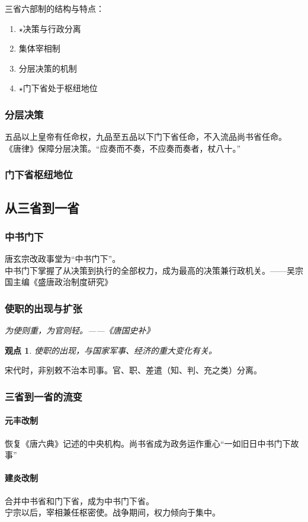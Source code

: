 \documentclass[twoside]{article}
\newtheorem{claim}[theorem]{观点}
\begin{document}
三省六部制的结构与特点：
\begin{enumerate}
    \item $\star$决策与行政分离
    \item 集体宰相制
    \item 分层决策的机制
    \item $\star$门下省处于枢纽地位
\end{enumerate}
\subsubsection{分层决策}
五品以上皇帝有任命权，九品至五品以下门下省任命，不入流品尚书省任命。\\
《唐律》保障分层决策。``应奏而不奏，不应奏而奏者，杖八十。''
\subsubsection{门下省枢纽地位}
\subsection{从三省到一省}
\subsubsection{中书门下}
唐玄宗改政事堂为``中书门下''。\\
中书门下掌握了从决策到执行的全部权力，成为最高的决策兼行政机关。——吴宗国主编《盛唐政治制度研究》\\
\subsubsection{使职的出现与扩张}
\textit{为使则重，为官则轻。——《唐国史补》}\\
\begin{claim}
    使职的出现，与国家军事、经济的重大变化有关。
\end{claim}
宋代时，非别敕不治本司事。官、职、差遣（知、判、充之类）分离。
\subsubsection{三省到一省的流变}
\paragraph{元丰改制}
恢复《唐六典》记述的中央机构。尚书省成为政务运作重心``一如旧日中书门下故事''\\
\paragraph{建炎改制}
合并中书省和门下省，成为中书门下省。\\
宁宗以后，宰相兼任枢密使。战争期间，权力倾向于集中。
\end{document}
